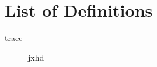 
\begingroup
\let\clearpage\relax
\let\cleardoublepage\relax
\let\cleardoublepage\relax

\chapter*{List of Definitions}
\rmfamily

\begin{description}
    \item[trace] jxhd
\end{description}


\acresetall

\vfill

\endgroup